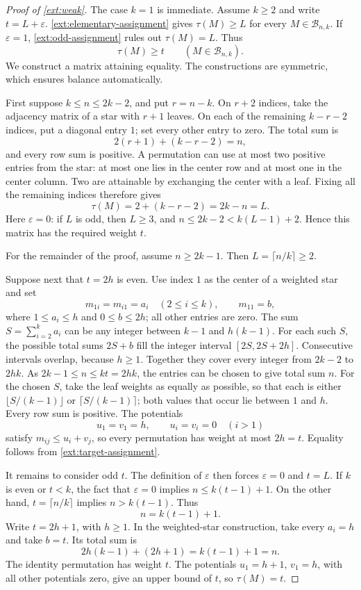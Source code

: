 \documentclass[11pt,reqno]{amsart}
\numberwithin{equation}{section}
\theoremstyle{definition}
\theoremstyle{remark}
\begin{document}
\begin{proof}[Proof of \cref{ext:weak}]
The case $k=1$ is immediate.  Assume $k\ge2$ and write
$t=L+\varepsilon$.  \cref{ext:elementary-assignment} gives
$\tau(M)\ge L$ for every $M\in\mathcal B_{n,k}$.  If
$\varepsilon=1$, \cref{ext:odd-assignment} rules out
$\tau(M)=L$.  Thus
\begin{equation}
\label{ext:target-assignment}
 \tau(M)\ge t\qquad(M\in\mathcal B_{n,k}).
\end{equation}
We construct a matrix attaining equality.  The constructions are
symmetric, which ensures balance automatically.

First suppose $k\le n\le2k-2$, and put $r=n-k$.  On $r+2$ indices,
take the adjacency matrix of a star with $r+1$ leaves.  On each of
the remaining $k-r-2$ indices, put a diagonal entry $1$; set every
other entry to zero.  The total sum is
\[
 2(r+1)+(k-r-2)=n,
\]
and every row sum is positive.  A permutation can use at most two
positive entries from the star: at most one lies in the center row
and at most one in the center column.  Two are attainable by
exchanging the center with a leaf.  Fixing all the remaining indices
therefore gives
\[
 \tau(M)=2+(k-r-2)=2k-n=L.
\]
Here $\varepsilon=0$: if $L$ is odd, then $L\ge3$, and
$n\le2k-2<k(L-1)+2$.  Hence this matrix has the required weight $t$.

For the remainder of the proof, assume $n\ge2k-1$.  Then
$L=\lceil n/k\rceil\ge2$.

Suppose next that $t=2h$ is even.  Use index $1$ as the center of a
weighted star and set
\[
 m_{1i}=m_{i1}=a_i\quad(2\le i\le k),\qquad m_{11}=b,
\]
where $1\le a_i\le h$ and $0\le b\le2h$; all other entries are zero.
The sum $S=\sum_{i=2}^k a_i$ can be any integer between $k-1$ and
$h(k-1)$.  For each such $S$, the possible total sums $2S+b$ fill the
integer interval $[2S,2S+2h]$.  Consecutive intervals overlap, because
$h\ge1$.  Together they cover every integer from $2k-2$ to $2hk$.
As $2k-1\le n\le kt=2hk$, the entries can be chosen to give total
sum $n$. For the chosen $S$, take the leaf weights as equally as
possible, so that each is either $\lfloor S/(k-1)\rfloor$ or
$\lceil S/(k-1)\rceil$; both values that occur lie between $1$ and $h$.
Every row sum is positive.  The potentials
\[
 u_1=v_1=h,\qquad u_i=v_i=0\quad(i>1)
\]
satisfy $m_{ij}\le u_i+v_j$, so every permutation has weight at most
$2h=t$.  Equality follows from \eqref{ext:target-assignment}.

It remains to consider odd $t$.  The definition of $\varepsilon$
then forces $\varepsilon=0$ and $t=L$.  If $k$ is even or $t<k$,
the fact that $\varepsilon=0$ implies $n\le k(t-1)+1$.  On the
other hand, $t=\lceil n/k\rceil$ implies $n>k(t-1)$.  Thus
\[
 n=k(t-1)+1.
\]
Write $t=2h+1$, with $h\ge1$.  In the weighted-star construction,
take every $a_i=h$ and take $b=t$.  Its total sum is
\[
 2h(k-1)+(2h+1)=k(t-1)+1=n.
\]
The identity permutation has weight $t$.  The potentials
$u_1=h+1$, $v_1=h$, with all other potentials zero, give an upper
bound of $t$, so $\tau(M)=t$.


\end{proof}
\end{document}
